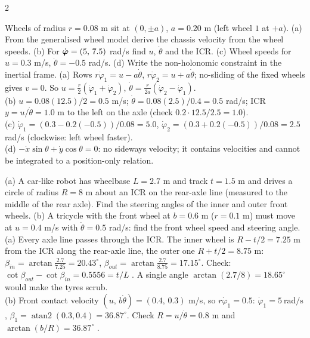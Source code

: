 \begin{multicols}{2}
\begin{examq}
Wheels of radius $r=0.08$ m sit at $(0,\pm a)$, $a=0.20$ m (left wheel $1$ at $+a$). (a) From the generalised wheel model derive the chassis velocity from the wheel speeds. (b) For $\dot{\boldsymbol\varphi}=(5,\,7.5)$ rad/s find $u$, $\dot\theta$ and the ICR. (c) Wheel speeds for $u=0.3$ m/s, $\dot\theta=-0.5$ rad/s. (d) Write the non-holonomic constraint in the inertial frame.
\solution
(a) Rows $r\dot\varphi_1=u-a\dot\theta$, $r\dot\varphi_2=u+a\dot\theta$; no-sliding of the fixed wheels gives $v=0$. So $u=\frac r2(\dot\varphi_1+\dot\varphi_2)$, $\dot\theta=\frac r{2a}(\dot\varphi_2-\dot\varphi_1)$. \\
(b) $u=0.08(12.5)/2=\boxed{0.5}$ m/s; $\dot\theta=0.08(2.5)/0.4=\boxed{0.5}$ rad/s; ICR $y=u/\dot\theta=\boxed{1.0}$ m to the left on the axle (check $0.2\cdot12.5/2.5=1.0$). \\
(c) $\dot\varphi_1=(0.3-0.2(-0.5))/0.08=\boxed{5.0}$, $\dot\varphi_2=(0.3+0.2(-0.5))/0.08=\boxed{2.5}$ rad/s (clockwise: left wheel faster). \\
(d) $-\dot x\sin\theta+\dot y\cos\theta=0$: no sideways velocity; it contains velocities and cannot be integrated to a position-only relation.  \chk
\end{examq}

\begin{examq}
(a) A car-like robot has wheelbase $L=2.7$ m and track $t=1.5$ m and drives a circle of radius $R=8$ m about an ICR on the rear-axle line (measured to the middle of the rear axle). Find the steering angles of the inner and outer front wheels. (b) A tricycle with the front wheel at $b=0.6$ m ($r=0.1$ m) must move at $u=0.4$ m/s with $\dot\theta=0.5$ rad/s: find the front wheel speed and steering angle.
\solution
(a) Every axle line passes through the ICR. The inner wheel is $R-t/2=7.25$ m from the ICR along the rear-axle line, the outer one $R+t/2=8.75$ m: $\beta_{in}=\arctan\frac{2.7}{7.25}=\boxed{20.43^\circ}$, $\beta_{out}=\arctan\frac{2.7}{8.75}=\boxed{17.15^\circ}$. Check: $\cot\beta_{out}-\cot\beta_{in}=0.5556=t/L$ \checkmark. A single angle $\arctan(2.7/8)=18.65^\circ$ would make the tyres scrub. \\
(b) Front contact velocity $(u,\,b\dot\theta)=(0.4,\,0.3)$ m/s, so $r\dot\varphi_1=0.5$: $\dot\varphi_1=\boxed{5\ \text{rad/s}}$, $\beta_1=\operatorname{atan2}(0.3,0.4)=\boxed{36.87^\circ}$. Check $R=u/\dot\theta=0.8$ m and $\arctan(b/R)=36.87^\circ$ \checkmark.  \chk
\end{examq}
\end{multicols}
